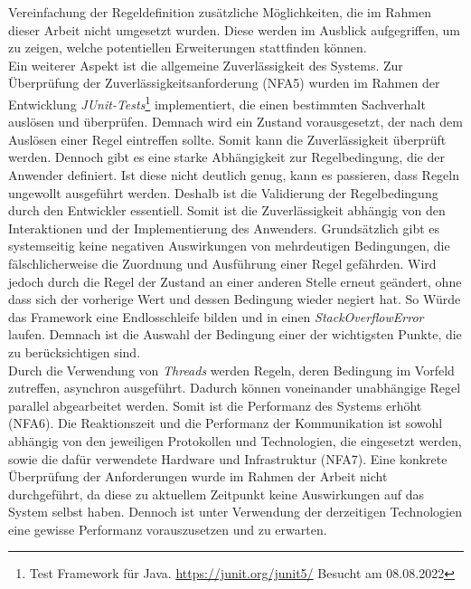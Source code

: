         Vereinfachung der Regeldefinition zusätzliche Möglichkeiten, die im Rahmen dieser Arbeit nicht umgesetzt wurden. Diese werden im Ausblick 
        aufgegriffen, um zu zeigen, welche potentiellen Erweiterungen stattfinden können. 
        \\
        \linebreak
        Ein weiterer Aspekt ist die allgemeine Zuverlässigkeit des Systems. Zur Überprüfung der Zuverlässigkeitsanforderung (NFA5) wurden im Rahmen der 
        Entwicklung \textit{JUnit-Tests}\footnote{Test Framework für Java. \url{https://junit.org/junit5/} Besucht am 08.08.2022} implementiert, die 
        einen bestimmten Sachverhalt auslösen und überprüfen. Demnach wird ein Zustand vorausgesetzt, der nach dem Auslösen einer Regel eintreffen sollte. Somit kann 
        die Zuverlässigkeit überprüft werden. Dennoch gibt es eine starke Abhängigkeit zur Regelbedingung, die der Anwender definiert. Ist diese 
        nicht deutlich genug, kann es passieren, dass Regeln ungewollt ausgeführt werden. Deshalb ist die Validierung der Regelbedingung durch den 
        Entwickler essentiell. Somit ist die Zuverlässigkeit abhängig von den Interaktionen und der Implementierung des Anwenders. Grundsätzlich gibt es 
        systemseitig keine negativen Auswirkungen von mehrdeutigen Bedingungen, die fälschlicherweise die Zuordnung und Ausführung einer Regel gefährden. Wird jedoch durch die 
        Regel der Zustand an einer anderen Stelle erneut geändert, ohne dass sich der vorherige Wert und dessen Bedingung wieder negiert hat. So Würde das 
        Framework eine Endlosschleife bilden und in einen \textit{StackOverflowError} laufen. Demnach ist die Auswahl der Bedingung einer der wichtigsten 
        Punkte, die zu berücksichtigen sind.
        \\
        \linebreak
        Durch die Verwendung von \textit{Threads} werden Regeln, deren Bedingung im Vorfeld zutreffen, asynchron ausgeführt. Dadurch können voneinander 
        unabhängige Regel parallel abgearbeitet werden. Somit ist die Performanz des Systems erhöht (NFA6). Die Reaktionszeit und die Performanz der 
        Kommunikation ist sowohl abhängig von den jeweiligen Protokollen und Technologien, die eingesetzt werden, sowie die dafür verwendete Hardware 
        und Infrastruktur (NFA7). Eine konkrete Überprüfung der Anforderungen wurde im Rahmen der Arbeit nicht durchgeführt, da diese zu aktuellem Zeitpunkt keine 
        Auswirkungen auf das System selbst haben. Dennoch ist unter Verwendung der derzeitigen Technologien eine gewisse Performanz vorauszusetzen und zu erwarten. 
